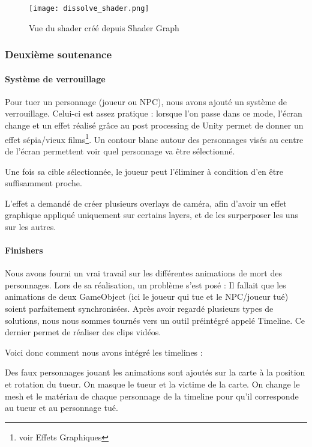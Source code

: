             \begin{figure}[hbt!]
                \centering
                \texttt{[image: dissolve\_shader.png]}
                \caption{Vue du shader créé depuis Shader Graph}
            \end{figure}
			\FloatBarrier



	\subsubsection{Deuxième soutenance}

		\paragraph{Système de verrouillage}

			Pour tuer un personnage (joueur ou NPC),
			nous avons ajouté un système de verrouillage. Celui-ci est assez pratique : lorsque l'on passe dans ce mode, l'écran change et 
			un effet réalisé grâce au post processing de Unity permet de donner un effet sépia/vieux films\footnote{voir Effets Graphiques}.
			Un contour blanc autour des personnages visés au centre de l'écran permettent voir quel personnage va être sélectionné.

			Une fois sa cible sélectionnée, le joueur peut l'éliminer à condition d'en être suffisamment proche.

			L'effet a demandé de créer plusieurs overlays de caméra, afin d'avoir un effet graphique
			appliqué uniquement sur certains layers, et de les surperposer les uns sur les autres. 

		\paragraph{Finishers}
			Nous avons fourni un vrai travail sur les différentes animations de mort des personnages.
			Lors de sa réalisation, un problème s'est posé : Il fallait que les animations de deux GameObject (ici le joueur qui tue et le NPC/joueur tué) 
			soient parfaitement synchronisées. Après avoir regardé plusieurs types de solutions, nous nous sommes tournés vers un outil préintégré appelé Timeline.
			Ce dernier permet de réaliser des clips vidéos.

			Voici donc comment nous avons intégré les timelines :
			
			Des faux personnages jouant les animations sont ajoutés sur la carte à la position et rotation du tueur.
			On masque le tueur et la victime de la carte.
			On change le mesh et le matériau de chaque personnage de la timeline pour qu'il corresponde au tueur et au
			personnage tué.

